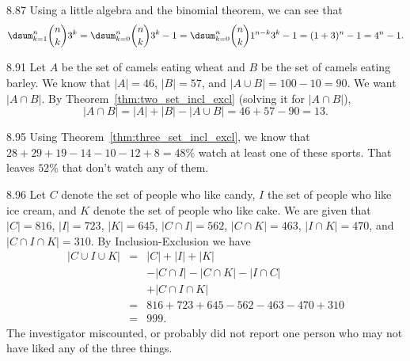 \begin{Answer}{8.87}
Using a little algebra and the binomial theorem,  we can see that
$$\dsum_{k=1}^{n} \binom{n}{k}3^k
=\dsum_{k=0}^{n} \binom{n}{k}3^{k}-1
=\dsum_{k=0}^{n} \binom{n}{k}1^{n-k}3^{k}-1
=(1+3)^{n}-1=4^n-1.$$
\end{Answer}
\begin{Answer}{8.91}
Let $A$ be the set of camels eating wheat and $B$ be the set of camels eating barley.
We know that $|A|=46$, $|B|=57$, and $|A\cup B|=100-10=90$.
We want $|A\cap B|$.  By Theorem~\ref{thm:two_set_incl_excl} (solving it for $|A\cap B|$),
$$|A\cap B| = |A|+|B|-|A \cup B| = 46+57-90=13.$$
\end{Answer}
\begin{Answer}{8.95}
Using Theorem~\ref{thm:three_set_incl_excl}, we know that
$28+29+19-14-10-12+8=48\%$  watch at least one of these sports.
That leaves $52\%$ that don't watch any of them.
\end{Answer}
\begin{Answer}{8.96}
Let $C$ denote the set of people
who like candy, $I$ the set of people who like ice cream, and $K$
denote the set of people who like cake. We are given that $|C|
= 816$, $|I| = 723$, $|K| = 645$, $|C\cap I| = 562$,
$|C\cap K| = 463$, $|I\cap K| = 470$, and $|C\cap I\cap K| = 310$. By Inclusion-Exclusion we have
$$\begin{array}{lll}
|C \cup I \cup K| & = & |C| + |I| + |K| \\ & & -
|C \cap I| - |C \cap K |
- |I \cap C| \\ & &  + |C \cap I \cap K| \\
& = & 816 + 723 + 645 - 562 - 463 - 470 + 310 \\ & = & 999.
\end{array}$$
The investigator miscounted, or probably did not report one person
who may not have liked any of the three things.
\end{Answer}
